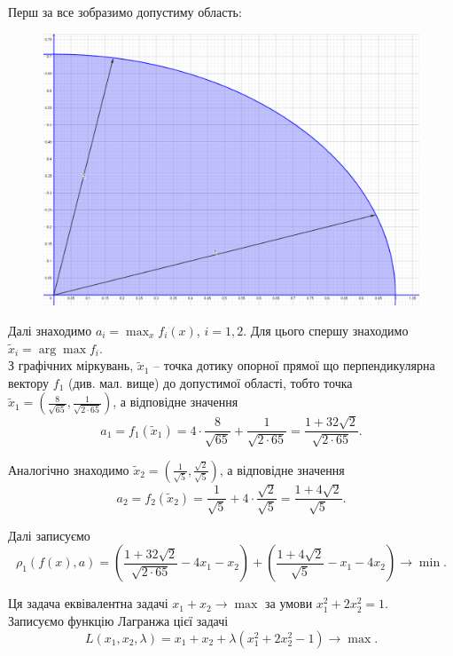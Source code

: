 \begin{solution}
    Перш за все зобразимо допустиму область:
    \begin{figure}[H]
        \centering
        \includegraphics[width=\textwidth]{ideal_point_1.png}
    \end{figure}
    
    Далі знаходимо $a_i = \max_x f_i(x)$, $i = 1, 2$. Для цього спершу знаходимо $\tilde x_i = \arg \max f_i$. \\
    
    З графічних міркувань, $\tilde x_1$ -- точка дотику опорної прямої що перпендикулярна вектору $f_1$ (див. мал. вище) до допустимої області, тобто точка $\tilde x_1 = \left( \frac{8}{\sqrt{65}}, \frac{1}{\sqrt{2 \cdot 65}} \right)$, а відповідне значення \[ a_1 = f_1(\tilde x_1) = 4 \cdot \frac{8}{\sqrt{65}} + \frac{1}{\sqrt{2 \cdot 65}} = \frac{1 + 32 \sqrt{2}}{\sqrt{2 \cdot 65}}. \]
    
    Аналогічно знаходимо $\tilde x_2 = \left( \frac{1}{\sqrt{5}}, \frac{\sqrt{2}}{\sqrt{5}}\right)$, а відповідне значення \[ a_2 = f_2(\tilde x_2) = \frac{1}{\sqrt{5}} + 4 \cdot \frac{\sqrt{2}}{\sqrt{5}} = \frac{1 + 4 \sqrt{2}}{\sqrt{5}}. \]
    
    Далі записуємо \[ \rho_1(f(x), a) =  \left( \frac{1 + 32 \sqrt{2}}{\sqrt{2 \cdot 65}} - 4 x_1 - x_2 \right) + \left( \frac{1 + 4 \sqrt{2}}{\sqrt{5}} - x_1 - 4 x_2 \right) \to \min. \]
    
    Ця задача еквівалентна задачі $x_1 + x_2 \to \max$ за умови $x_1^2 + 2 x_2^2 = 1$. \\
    
    Записуємо функцію Лагранжа цієї задачі \[ L(x_1, x_2, \lambda) = x_1 + x_2 + \lambda (x_1^2 + 2 x_2^2 - 1) \to \max. \]
    

\end{solution}
